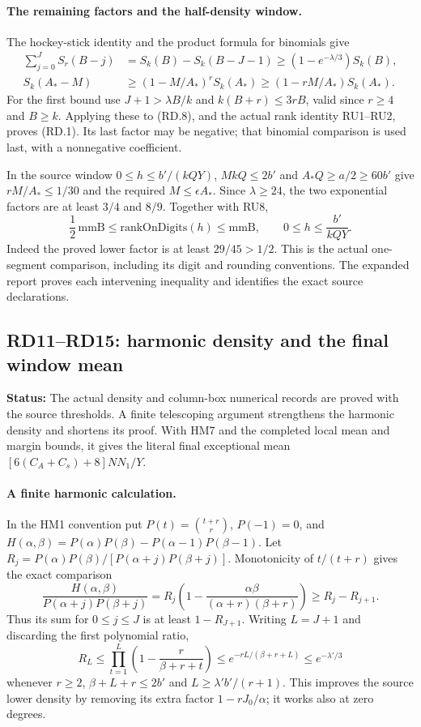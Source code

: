 \documentclass[11pt,a4paper]{article}
\numberwithin{equation}{section}
\theoremstyle{remark}\newtheorem{remark}[theorem]{Remark}
\newcommand{\status}[1]{\textbf{Status:} #1}
\begin{document}
\paragraph{The remaining factors and the half-density window.}
The hockey-stick identity and the product formula for binomials give
\[
\begin{aligned}
 \sum_{j=0}^{J}S_r(B-j)&=S_k(B)-S_k(B-J-1)
                    \ge(1-e^{-\lambda/3})S_k(B),\\
 S_k(A_*-M)&\ge(1-M/A_*)^rS_k(A_*)
                    \ge(1-rM/A_*)S_k(A_*).
\end{aligned}
\]
For the first bound use $J+1>\lambda B/k$ and
$k(B+r)\le3rB$, valid since $r\ge4$ and $B\ge k$.
Applying these to (RD.8), and the actual rank identity RU1--RU2,
proves (RD.1). Its last factor may be negative; that binomial comparison
is used last, with a nonnegative coefficient.

In the source window $0\le h\le b'/(kQY)$,
$MkQ\le2b'$ and $A_*Q\ge a/2\ge60b'$ give
$rM/A_*\le1/30$ and the required $M\le\epsilon A_*$.
Since $\lambda\ge24$, the two exponential factors are at least
$3/4$ and $8/9$. Together with RU8,
\[
       \frac12\,\mathrm{mmB}
       \le\mathrm{rankOnDigits}(h)\le\mathrm{mmB},
       \qquad 0\le h\le\frac{b'}{kQY}.
 \tag{RD.9}
\]
Indeed the proved lower factor is at least $29/45>1/2$.
This is the actual one-segment comparison, including its digit and
rounding conventions. The expanded report proves each intervening
inequality and identifies the exact source declarations.

\subsection{RD11--RD15: harmonic density and the final window mean}
\label{sec:rank-density-mean}

\status{The actual density and column-box numerical records are proved
with the source thresholds. A finite telescoping argument strengthens
the harmonic density and shortens its proof. With HM7 and the completed
local mean and margin bounds, it gives the literal final exceptional
mean $[6(C_A+C_s)+8]NN_1/Y$.}

\paragraph{A finite harmonic calculation.}
In the HM1 convention put $P(t)=\binom{t+r}{r}$, $P(-1)=0$, and
$H(\alpha,\beta)=P(\alpha)P(\beta)-P(\alpha-1)P(\beta-1)$.
Let $R_j=P(\alpha)P(\beta)/[P(\alpha+j)P(\beta+j)]$.
Monotonicity of $t/(t+r)$ gives the exact comparison
\[
 \frac{H(\alpha,\beta)}{P(\alpha+j)P(\beta+j)}
 =R_j\left(1-\frac{\alpha\beta}{(\alpha+r)(\beta+r)}\right)
 \ge R_j-R_{j+1}.
 \tag{RD.10}
\]
Thus its sum for $0\le j\le J$ is at least $1-R_{J+1}$.
Writing $L=J+1$ and discarding the first polynomial ratio,
\[
 R_L\le\prod_{t=1}^{L}\left(1-\frac r{\beta+r+t}\right)
 \le e^{-rL/(\beta+r+L)}\le e^{-\lambda'/3}
 \tag{RD.11}
\]
whenever $r\ge2$, $\beta+L+r\le2b'$ and
$L\ge\lambda'b'/(r+1)$. This improves the source lower density by
removing its extra factor $1-rJ_0/\alpha$; it works also at zero degrees.
\end{document}
